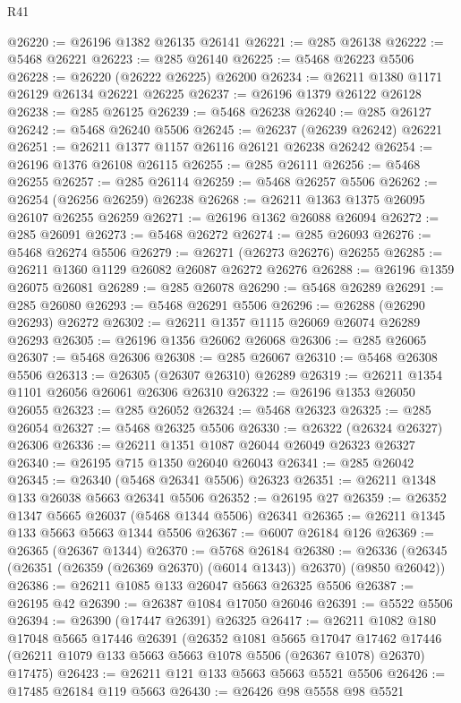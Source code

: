 \begin{lexlean}{R41}
\begin{coremodule}
@26220 := @26196 @1382 @26135 @26141
@26221 := @285 @26138
@26222 := @5468 @26221
@26223 := @285 @26140
@26225 := @5468 @26223 @5506
@26228 := @26220 (@26222 @26225) @26200
@26234 := @26211 @1380 @1171 @26129 @26134 @26221 @26225
@26237 := @26196 @1379 @26122 @26128
@26238 := @285 @26125
@26239 := @5468 @26238
@26240 := @285 @26127
@26242 := @5468 @26240 @5506
@26245 := @26237 (@26239 @26242) @26221
@26251 := @26211 @1377 @1157 @26116 @26121 @26238 @26242
@26254 := @26196 @1376 @26108 @26115
@26255 := @285 @26111
@26256 := @5468 @26255
@26257 := @285 @26114
@26259 := @5468 @26257 @5506
@26262 := @26254 (@26256 @26259) @26238
@26268 := @26211 @1363 @1375 @26095 @26107 @26255 @26259
@26271 := @26196 @1362 @26088 @26094
@26272 := @285 @26091
@26273 := @5468 @26272
@26274 := @285 @26093
@26276 := @5468 @26274 @5506
@26279 := @26271 (@26273 @26276) @26255
@26285 := @26211 @1360 @1129 @26082 @26087 @26272 @26276
@26288 := @26196 @1359 @26075 @26081
@26289 := @285 @26078
@26290 := @5468 @26289
@26291 := @285 @26080
@26293 := @5468 @26291 @5506
@26296 := @26288 (@26290 @26293) @26272
@26302 := @26211 @1357 @1115 @26069 @26074 @26289 @26293
@26305 := @26196 @1356 @26062 @26068
@26306 := @285 @26065
@26307 := @5468 @26306
@26308 := @285 @26067
@26310 := @5468 @26308 @5506
@26313 := @26305 (@26307 @26310) @26289
@26319 := @26211 @1354 @1101 @26056 @26061 @26306 @26310
@26322 := @26196 @1353 @26050 @26055
@26323 := @285 @26052
@26324 := @5468 @26323
@26325 := @285 @26054
@26327 := @5468 @26325 @5506
@26330 := @26322 (@26324 @26327) @26306
@26336 := @26211 @1351 @1087 @26044 @26049 @26323 @26327
@26340 := @26195 @715 @1350 @26040 @26043
@26341 := @285 @26042
@26345 := @26340 (@5468 @26341 @5506) @26323
@26351 := @26211 @1348 @133 @26038 @5663 @26341 @5506
@26352 := @26195 @27
@26359 := @26352 @1347 @5665 @26037 (@5468 @1344 @5506) @26341
@26365 := @26211 @1345 @133 @5663 @5663 @1344 @5506
@26367 := @6007 @26184 @126
@26369 := @26365 (@26367 @1344)
@26370 := @5768 @26184
@26380 := @26336 (@26345 (@26351 (@26359 (@26369 @26370) (@6014 @1343)) @26370) (@9850 @26042))
@26386 := @26211 @1085 @133 @26047 @5663 @26325 @5506
@26387 := @26195 @42
@26390 := @26387 @1084 @17050 @26046
@26391 := @5522 @5506
@26394 := @26390 (@17447 @26391) @26325
@26417 := @26211
    @1082
    @180
    @17048
    @5665
    @17446
    @26391
    (@26352
      @1081
      @5665
      @17047
      @17462
      @17446
      (@26211 @1079 @133 @5663 @5663 @1078 @5506 (@26367 @1078) @26370)
      @17475)
@26423 := @26211 @121 @133 @5663 @5663 @5521 @5506
@26426 := @17485 @26184 @119 @5663
@26430 := @26426 @98 @5558 @98 @5521

\end{coremodule}
\end{lexlean}
